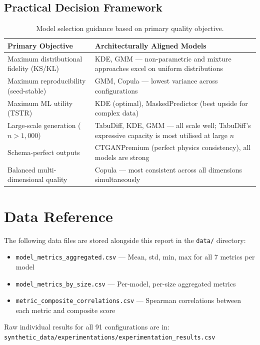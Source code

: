 \documentclass[11pt, a4paper]{report}
\begin{document}
\section{Practical Decision Framework}

\begin{table}[H]
\centering
\caption{Model selection guidance based on primary quality objective.}
\label{tab:framework}
\begin{tabularx}{\textwidth}{lX}
\toprule
\textbf{Primary Objective} & \textbf{Architecturally Aligned Models} \\
\midrule
Maximum distributional fidelity (KS/KL)
  & KDE, GMM --- non-parametric and mixture approaches excel on uniform distributions \\[4pt]
Maximum reproducibility (seed-stable)
  & GMM, Copula --- lowest variance across configurations \\[4pt]
Maximum ML utility (TSTR)
  & KDE (optimal), MaskedPredictor (best upside for complex data) \\[4pt]
Large-scale generation ($n > 1{,}000$)
  & TabuDiff, KDE, GMM --- all scale well; TabuDiff's expressive capacity is most utilised at large $n$ \\[4pt]
Schema-perfect outputs
  & CTGANPremium (perfect physics consistency), all models are strong \\[4pt]
Balanced multi-dimensional quality
  & Copula --- most consistent across all dimensions simultaneously \\
\bottomrule
\end{tabularx}
\end{table}

\appendix
\chapter{Data Reference}

The following data files are stored alongside this report in the \texttt{data/} directory:
\begin{itemize}[nosep]
\item \texttt{model\_metrics\_aggregated.csv} --- Mean, std, min, max for all 7 metrics per model
\item \texttt{model\_metrics\_by\_size.csv} --- Per-model, per-size aggregated metrics
\item \texttt{metric\_composite\_correlations.csv} --- Spearman correlations between each metric and composite score
\end{itemize}

Raw individual results for all 91 configurations are in:
\texttt{synthetic\_data/experimentations/experimentation\_results.csv}
\end{document}
